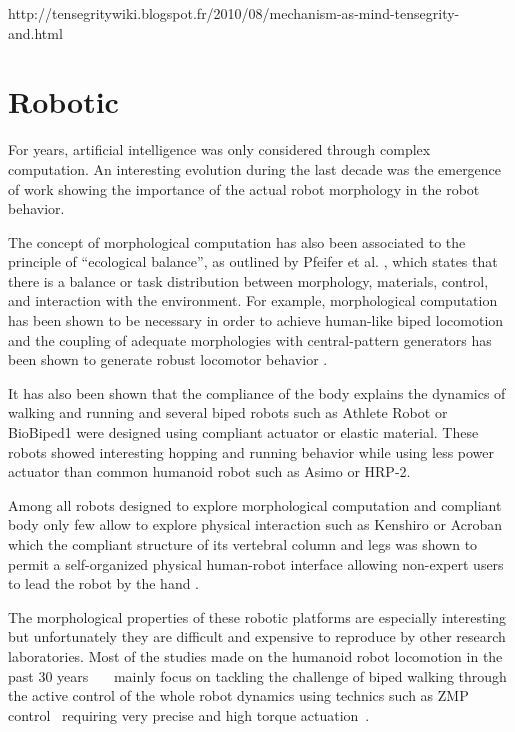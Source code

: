 \begin{figure}[]
\centering
    \hfil
    \caption{}
    \label{fig:}
\end{figure}

http://tensegritywiki.blogspot.fr/2010/08/mechanism-as-mind-tensegrity-and.html

\section{Robotic} %
For years, artificial intelligence was only considered through complex computation. An interesting evolution during the last decade was the emergence of work showing the importance of the actual robot morphology in the robot behavior.

The concept of morphological computation has also been associated to the principle of “ecological balance”, as outlined by Pfeifer et al. \cite{pfeifer2005new}, which states that there is a balance or task distribution between morphology, materials, control, and interaction with the environment. For example, morphological computation has been shown to be necessary in order to achieve human-like biped locomotion \cite{matsushita2005locomoting} and the coupling of adequate morphologies with central-pattern generators has been shown to generate robust locomotor behavior \cite{ijspeert2007swimming}\cite{steingrube2010self}.


It has also been shown that the compliance of the body explains the dynamics of walking and running \cite{Geyer2006} and several biped robots such as Athlete Robot \cite{niiyama2010athlete} or BioBiped1 \cite{radkhah2011concept} were designed using compliant actuator or elastic material. These robots showed interesting hopping and running behavior while using less power actuator than common humanoid robot such as Asimo or HRP-2.

Among all robots designed to explore morphological computation and compliant body only few allow to explore physical interaction such as Kenshiro \cite{Asano2012} or Acroban which the compliant structure of its vertebral column and legs was shown to permit a self-organized physical human-robot interface allowing non-expert users to lead the robot by the hand \cite{Ly2011bio}\cite{Oudeyer2011}.

The morphological properties of these robotic platforms are especially interesting but unfortunately they are difficult and expensive to reproduce by other research laboratories.
Most of the studies made on the humanoid robot locomotion in the past 30 years~\cite{park1998biped}~\cite{aoi2005locomotion}~\cite{park1998biped} mainly focus on tackling the challenge of biped walking through the active control of the whole robot dynamics using technics such as ZMP control~\cite{vukobratovic2004zero} requiring very precise and high torque actuation~\cite{akachi2005development}.

